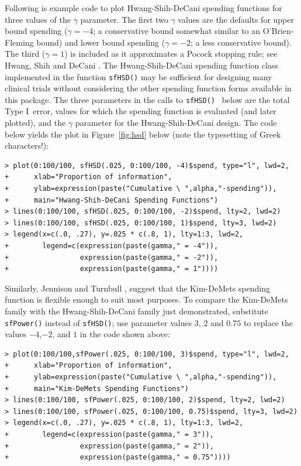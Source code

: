 Following is example code to plot Hwang-Shih-DeCani spending
functions for three values of the $\gamma$ parameter. The first two $\gamma$
values are the defaults for upper bound spending ($\gamma = -4$; a conservative
bound somewhat similar to an O'Brien-Fleming bound) and lower bound spending
($\gamma = -2$; a less conservative bound). The third ($\gamma = 1$) is
included as it approximates a Pocock stopping rule; see Hwang, Shih and DeCani
\cite{HwangShihDeCani}. The Hwang-Shih-DeCani spending function class
implemented in the function \texttt{sfHSD()} may be sufficient for designing
many clinical trials without considering the other spending function forms
available in this package. The three parameters in the calls to 
\texttt{sfHSD()}%
\ below are the total Type I\ error, values for which the spending function is
evaluated (and later plotted), and the $\gamma$ parameter for the
Hwang-Shih-DeCani design. 
The code
below yields the plot in Figure~\ref{fig:hsd} below (note the typesetting of Greek characters!):

\bigskip

\begin{verbatim}
> plot(0:100/100, sfHSD(.025, 0:100/100, -4)$spend, type="l", lwd=2,
+      xlab="Proportion of information",
+      ylab=expression(paste("Cumulative \ ",alpha,"-spending")),
+      main="Hwang-Shih-DeCani Spending Functions")
> lines(0:100/100, sfHSD(.025, 0:100/100, -2)$spend, lty=2, lwd=2)
> lines(0:100/100, sfHSD(.025, 0:100/100, 1)$spend, lty=3, lwd=2)
> legend(x=c(.0, .27), y=.025 * c(.8, 1), lty=1:3, lwd=2,
+        legend=c(expression(paste(gamma," = -4")),
+                 expression(paste(gamma," = -2")),
+                 expression(paste(gamma," = 1"))))
\end{verbatim}
\bigskip

Similarly, Jennison and Turnbull \cite{JTBook},
suggest that the Kim-DeMets spending function is flexible enough to suit most
purposes. To compare the Kim-DeMets family with the Hwang-Shih-DeCani family
just demonstrated, substitute \texttt{sfPower()} instead of
\texttt{sfHSD()}; use parameter values $3$, $2$ and $0.75$ to 
replace the values $-4$,$-2$, and $1$ in the code shown above: 

\bigskip
\begin{verbatim}
> plot(0:100/100,sfPower(.025, 0:100/100, 3)$spend, type="l", lwd=2,
+      xlab="Proportion of information",
+      ylab=expression(paste("Cumulative \ ",alpha,"-spending")),
+      main="Kim-DeMets Spending Functions")
> lines(0:100/100, sfPower(.025, 0:100/100, 2)$spend, lty=2, lwd=2)
> lines(0:100/100, sfPower(.025, 0:100/100, 0.75)$spend, lty=3, lwd=2)
> legend(x=c(.0, .27), y=.025 * c(.8, 1), lty=1:3, lwd=2,
+        legend=c(expression(paste(gamma," = 3")),
+                 expression(paste(gamma," = 2")),
+                 expression(paste(gamma," = 0.75"))))
\end{verbatim}

